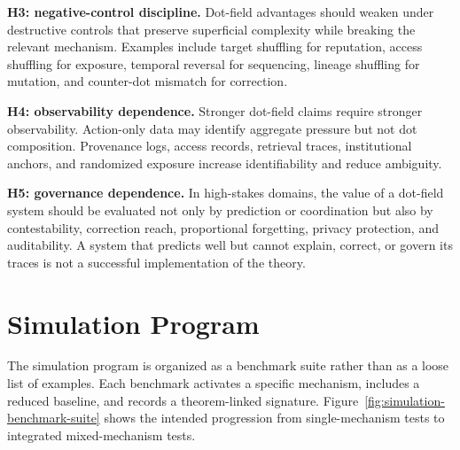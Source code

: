 \documentclass[11pt]{article}
\theoremstyle{remark}
\begin{document}
\textbf{H3: negative-control discipline.} Dot-field advantages should weaken under destructive controls that preserve superficial complexity while breaking the relevant mechanism. Examples include target shuffling for reputation, access shuffling for exposure, temporal reversal for sequencing, lineage shuffling for mutation, and counter-dot mismatch for correction.

\textbf{H4: observability dependence.} Stronger dot-field claims require stronger observability. Action-only data may identify aggregate pressure but not dot composition. Provenance logs, access records, retrieval traces, institutional anchors, and randomized exposure increase identifiability and reduce ambiguity.

\textbf{H5: governance dependence.} In high-stakes domains, the value of a dot-field system should be evaluated not only by prediction or coordination but also by contestability, correction reach, proportional forgetting, privacy protection, and auditability. A system that predicts well but cannot explain, correct, or govern its traces is not a successful implementation of the theory.


\section{Simulation Program}\label{simulation-program}

The simulation program is organized as a benchmark suite rather than as a loose list of examples. Each benchmark activates a specific mechanism, includes a reduced baseline, and records a theorem-linked signature. Figure~\ref{fig:simulation-benchmark-suite} shows the intended progression from single-mechanism tests to integrated mixed-mechanism tests.
\end{document}
